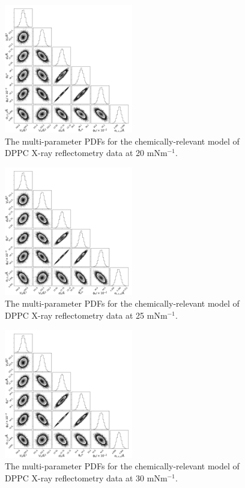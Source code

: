 \documentclass[11pt,a4paper]{paper}
\begin{document}
\begin{figure}[H]
	\centering
	\includegraphics[width=0.50\textwidth]{figures/dppc2_all_corner}
	\caption{The multi-parameter PDFs for the chemically-relevant model of DPPC X-ray reflectometry data at 20 mNm$^{-1}$.}
	\label{fig:dppc3}
\end{figure}
\begin{figure}[H]
	\centering
	\includegraphics[width=0.50\textwidth]{figures/dppc3_all_corner}
	\caption{The multi-parameter PDFs for the chemically-relevant model of DPPC X-ray reflectometry data at 25 mNm$^{-1}$.}
	\label{fig:dppc4}
\end{figure}
\begin{figure}[H]
	\centering
	\includegraphics[width=0.50\textwidth]{figures/dppc4_all_corner}
	\caption{The multi-parameter PDFs for the chemically-relevant model of DPPC X-ray reflectometry data at 30 mNm$^{-1}$.}
	\label{fig:dppc5}
\end{figure}
\end{document}
